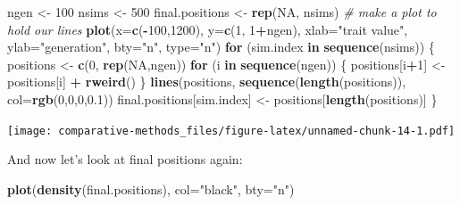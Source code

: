 \documentclass[
]{article}
\newenvironment{Shaded}{\begin{snugshade}}{\end{snugshade}}
\newcommand{\CommentTok}[1]{\textcolor[rgb]{0.56,0.35,0.01}{\textit{#1}}}
\newcommand{\ControlFlowTok}[1]{\textcolor[rgb]{0.13,0.29,0.53}{\textbf{#1}}}
\newcommand{\DataTypeTok}[1]{\textcolor[rgb]{0.13,0.29,0.53}{#1}}
\newcommand{\DecValTok}[1]{\textcolor[rgb]{0.00,0.00,0.81}{#1}}
\newcommand{\FloatTok}[1]{\textcolor[rgb]{0.00,0.00,0.81}{#1}}
\newcommand{\KeywordTok}[1]{\textcolor[rgb]{0.13,0.29,0.53}{\textbf{#1}}}
\newcommand{\NormalTok}[1]{#1}
\newcommand{\OperatorTok}[1]{\textcolor[rgb]{0.81,0.36,0.00}{\textbf{#1}}}
\newcommand{\OtherTok}[1]{\textcolor[rgb]{0.56,0.35,0.01}{#1}}
\newcommand{\StringTok}[1]{\textcolor[rgb]{0.31,0.60,0.02}{#1}}
\begin{document}
\begin{Shaded}
\begin{Highlighting}[]
\NormalTok{ngen <{-}}\StringTok{ }\DecValTok{100}
\NormalTok{nsims <{-}}\StringTok{ }\DecValTok{500}
\NormalTok{final.positions <{-}}\StringTok{ }\KeywordTok{rep}\NormalTok{(}\OtherTok{NA}\NormalTok{, nsims)}
\CommentTok{\# make a plot to hold our lines}
\KeywordTok{plot}\NormalTok{(}\DataTypeTok{x=}\KeywordTok{c}\NormalTok{(}\OperatorTok{{-}}\DecValTok{100}\NormalTok{,}\DecValTok{1200}\NormalTok{), }\DataTypeTok{y=}\KeywordTok{c}\NormalTok{(}\DecValTok{1}\NormalTok{, }\DecValTok{1}\OperatorTok{+}\NormalTok{ngen), }\DataTypeTok{xlab=}\StringTok{"trait value"}\NormalTok{, }\DataTypeTok{ylab=}\StringTok{"generation"}\NormalTok{, }\DataTypeTok{bty=}\StringTok{"n"}\NormalTok{, }\DataTypeTok{type=}\StringTok{"n"}\NormalTok{)}
\ControlFlowTok{for}\NormalTok{ (sim.index }\ControlFlowTok{in} \KeywordTok{sequence}\NormalTok{(nsims)) \{}
\NormalTok{  positions <{-}}\StringTok{ }\KeywordTok{c}\NormalTok{(}\DecValTok{0}\NormalTok{, }\KeywordTok{rep}\NormalTok{(}\OtherTok{NA}\NormalTok{,ngen))}
  \ControlFlowTok{for}\NormalTok{ (i }\ControlFlowTok{in} \KeywordTok{sequence}\NormalTok{(ngen)) \{}
\NormalTok{    positions[i}\OperatorTok{+}\DecValTok{1}\NormalTok{] <{-}}\StringTok{ }\NormalTok{positions[i] }\OperatorTok{+}\StringTok{ }\KeywordTok{rweird}\NormalTok{()}
\NormalTok{  \}}
  \KeywordTok{lines}\NormalTok{(positions, }\KeywordTok{sequence}\NormalTok{(}\KeywordTok{length}\NormalTok{(positions)), }\DataTypeTok{col=}\KeywordTok{rgb}\NormalTok{(}\DecValTok{0}\NormalTok{,}\DecValTok{0}\NormalTok{,}\DecValTok{0}\NormalTok{,}\FloatTok{0.1}\NormalTok{))}
\NormalTok{  final.positions[sim.index] <{-}}\StringTok{ }\NormalTok{positions[}\KeywordTok{length}\NormalTok{(positions)]}
\NormalTok{\}}
\end{Highlighting}
\end{Shaded}

\texttt{[image: comparative-methods\_files/figure-latex/unnamed-chunk-14-1.pdf]}

And now let's look at final positions again:

\begin{Shaded}
\begin{Highlighting}[]
\KeywordTok{plot}\NormalTok{(}\KeywordTok{density}\NormalTok{(final.positions), }\DataTypeTok{col=}\StringTok{"black"}\NormalTok{, }\DataTypeTok{bty=}\StringTok{"n"}\NormalTok{)}
\end{Highlighting}
\end{Shaded}
\end{document}
